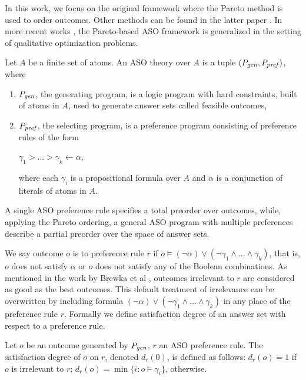 In this work, we focus on the original framework \cite{Brewka03answerset} where 
the Pareto method is used to order outcomes.
Other methods can be found in the latter paper \cite{Brewka04}.
In more recent works \cite{Faber:QOP,Faber:APF}, 
the Pareto-based ASO framework is generalized in the setting of
qualitative optimization problems.


\begin{definition}
	Let $A$ be a finite set of atoms.
	An ASO theory over $A$ is a tuple $(P_{\mathit{gen}},P_{\mathit{pref}})$, where
	\begin{enumerate} \itemsep -4pt
		\item $P_{\mathit{gen}}$, the generating program, is a logic program
					with hard constraints, built of atoms in $A$,
					used to generate answer sets called feasible outcomes,
		\item $P_{\mathit{pref}}$, the selecting program, is a preference
					program consisting of preference rules of the form
			\begin{center}
				$\gamma_1 > \ldots > \gamma_k \leftarrow \alpha$,
			\end{center}
					where each $\gamma_i$ is a propositional formula
					over $A$ and $\alpha$ is a conjunction of
					literals of atoms in $A$.
	\end{enumerate}
\end{definition}


A single ASO preference rule specifies a total preorder over outcomes, while,
applying the Pareto ordering, a general ASO program with multiple preferences
describe a partial preorder over the space of answer sets.

We say outcome $o$ is  to preference rule $r$ if
$o \models (\neg \alpha) \vee (\neg \gamma_1 \wedge \ldots \wedge \gamma_k)$,
that is, $o$ does not satisfy $\alpha$ or $o$ does not satisfy any of
the Boolean combinations. As mentioned in the work by Brewka et al \cite{Brewka03answerset},
outcomes irrelevant to $r$ are considered as good as the
best outcomes.
This default treatment of irrelevance can be overwritten by
including formula $(\neg \alpha) \vee (\neg \gamma_1 \wedge \ldots \wedge \gamma_k)$
in any place of the preference rule $r$.
Formally we define satisfaction degree of an answer set with respect to a
preference rule.
\begin{definition}
	Let $o$ be an outcome generated by $P_{\mathit{gen}}$,
	$r$ an ASO preference rule.
	The satisfaction degree of $o$ on $r$, denoted $d_r(0)$,
	is defined as follows: $d_r(o)=1$ if $o$ is irrelevant to $r$;
	$d_r(o)=\min\{i:o \models \gamma_i\}$, otherwise.
\end{definition}

